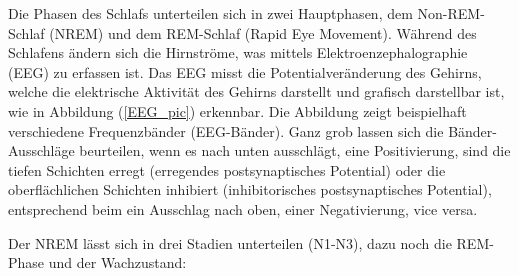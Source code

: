 \documentclass[a4paper, 12pt]{article}
\begin{document}
Die Phasen des Schlafs unterteilen sich in zwei Hauptphasen, dem Non-REM-Schlaf (NREM) und dem REM-Schlaf (Rapid Eye Movement). Während des Schlafens ändern sich die Hirnströme, was mittels Elektroenzephalographie (EEG) zu erfassen ist. Das EEG misst die Potentialveränderung des Gehirns, welche die elektrische Aktivität des Gehirns darstellt und grafisch darstellbar ist, wie in Abbildung (\ref{EEG_pic}) erkennbar. Die Abbildung zeigt beispielhaft verschiedene Frequenzbänder (EEG-Bänder). Ganz grob lassen sich die Bänder-Ausschläge beurteilen, wenn es nach unten ausschlägt, eine Positivierung, sind die tiefen Schichten erregt (erregendes postsynaptisches Potential) oder die oberflächlichen Schichten inhibiert (inhibitorisches postsynaptisches Potential), entsprechend beim ein Ausschlag nach oben, einer Negativierung, vice versa.  \cite{flexikon}

Der NREM lässt sich in drei Stadien unterteilen (N1-N3), dazu noch die REM-Phase und der Wachzustand:
\end{document}
